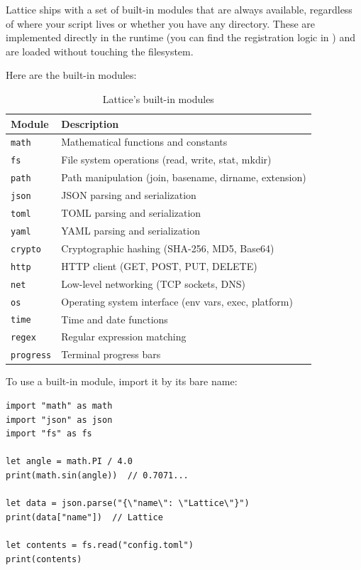 Lattice ships with a set of built-in modules that are always available, regardless of where your script lives or whether you have any  directory.
These are implemented directly in the runtime (you can find the registration logic in ) and are loaded without touching the filesystem.

Here are the built-in modules:

\begin{table}[h]
\centering
\caption{Lattice's built-in modules}\label{tab:builtin-modules}
\begin{tabular}{@{}ll@{}}
\toprule
\textbf{Module} & \textbf{Description} \\
\midrule
\texttt{math}    & Mathematical functions and constants \\
\texttt{fs}      & File system operations (read, write, stat, mkdir) \\
\texttt{path}    & Path manipulation (join, basename, dirname, extension) \\
\texttt{json}    & JSON parsing and serialization \\
\texttt{toml}    & TOML parsing and serialization \\
\texttt{yaml}    & YAML parsing and serialization \\
\texttt{crypto}  & Cryptographic hashing (SHA-256, MD5, Base64) \\
\texttt{http}    & HTTP client (GET, POST, PUT, DELETE) \\
\texttt{net}     & Low-level networking (TCP sockets, DNS) \\
\texttt{os}      & Operating system interface (env vars, exec, platform) \\
\texttt{time}    & Time and date functions \\
\texttt{regex}   & Regular expression matching \\
\texttt{progress} & Terminal progress bars \\
\bottomrule
\end{tabular}
\end{table}

To use a built-in module, import it by its bare name:

\begin{lstlisting}[language=Lattice, caption={Using built-in modules}]
import "math" as math
import "json" as json
import "fs" as fs

let angle = math.PI / 4.0
print(math.sin(angle))  // 0.7071...

let data = json.parse("{\"name\": \"Lattice\"}")
print(data["name"])  // Lattice

let contents = fs.read("config.toml")
print(contents)
\end{lstlisting}

